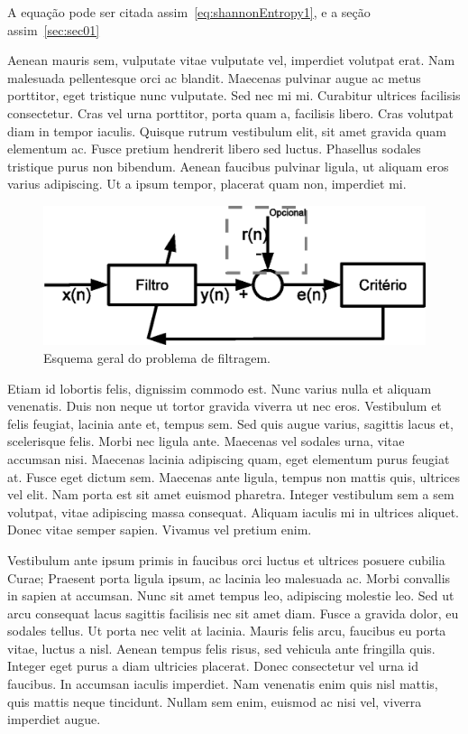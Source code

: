 A equa\c{c}\~{a}o pode ser citada assim~\eqref{eq:shannonEntropy1}, e a se\c{c}\~{a}o assim~\ref{sec:sec01}

Aenean mauris sem, vulputate vitae vulputate vel, imperdiet volutpat erat. Nam malesuada pellentesque orci ac blandit. Maecenas pulvinar augue ac metus porttitor, eget tristique nunc vulputate. Sed nec mi mi. Curabitur ultrices facilisis consectetur. Cras vel urna porttitor, porta quam a, facilisis libero. Cras volutpat diam in tempor iaculis. Quisque rutrum vestibulum elit, sit amet gravida quam elementum ac. Fusce pretium hendrerit libero sed luctus. Phasellus sodales tristique purus non bibendum. Aenean faucibus pulvinar ligula, ut aliquam eros varius adipiscing. Ut a ipsum tempor, placerat quam non, imperdiet mi.

\begin{figure}[htb]
\centering
	\includegraphics[width=.7\columnwidth]{cap1/filtering}
\caption{Esquema geral do problema de filtragem.}
\label{fig:filtering}
\end{figure}

Etiam id lobortis felis, dignissim commodo est. Nunc varius nulla et aliquam venenatis. Duis non neque ut tortor gravida viverra ut nec eros. Vestibulum et felis feugiat, lacinia ante et, tempus sem. Sed quis augue varius, sagittis lacus et, scelerisque felis. Morbi nec ligula ante. Maecenas vel sodales urna, vitae accumsan nisi. Maecenas lacinia adipiscing quam, eget elementum purus feugiat at. Fusce eget dictum sem. Maecenas ante ligula, tempus non mattis quis, ultrices vel elit. Nam porta est sit amet euismod pharetra. Integer vestibulum sem a sem volutpat, vitae adipiscing massa consequat. Aliquam iaculis mi in ultrices aliquet. Donec vitae semper sapien. Vivamus vel pretium enim.

Vestibulum ante ipsum primis in faucibus orci luctus et ultrices posuere cubilia Curae; Praesent porta ligula ipsum, ac lacinia leo malesuada ac. Morbi convallis in sapien at accumsan. Nunc sit amet tempus leo, adipiscing molestie leo. Sed ut arcu consequat lacus sagittis facilisis nec sit amet diam. Fusce a gravida dolor, eu sodales tellus. Ut porta nec velit at lacinia. Mauris felis arcu, faucibus eu porta vitae, luctus a nisl. Aenean tempus felis risus, sed vehicula ante fringilla quis. Integer eget purus a diam ultricies placerat. Donec consectetur vel urna id faucibus. In accumsan iaculis imperdiet. Nam venenatis enim quis nisl mattis, quis mattis neque tincidunt. Nullam sem enim, euismod ac nisi vel, viverra imperdiet augue.

